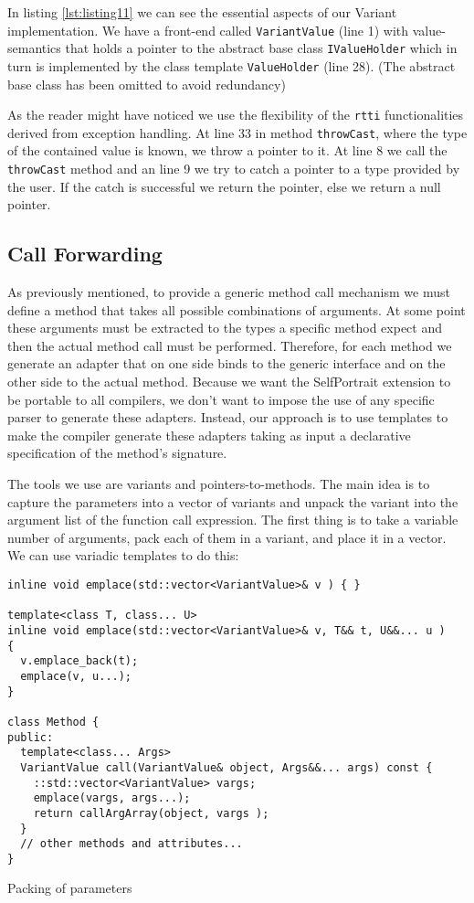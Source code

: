 In listing \ref{lst:listing11} we can see the essential aspects of our Variant implementation. We have a front-end called \texttt{VariantValue} (line 1)
with value-semantics that holds a pointer to the abstract base class \texttt{IValueHolder} which in turn is implemented by the class template
\texttt{ValueHolder} (line 28). (The abstract base class has been omitted to avoid redundancy)

As the reader might have noticed we use the flexibility of the \texttt{rtti} functionalities derived from exception handling.
At line 33 in method \texttt{throwCast}, where the type of the contained value is known, we throw a pointer to it. At line 8
we call the \texttt{throwCast} method and an line 9 we try to catch a pointer to a type provided by the user. If the catch is
successful we return the pointer, else we return a null pointer.

\subsection{Call Forwarding}

As previously mentioned, to provide a generic method call mechanism we must define a method that takes all possible combinations of arguments.
At some point these arguments must be extracted to the types a specific method expect and then the actual method call must be performed.
Therefore, for each method we generate an adapter that on one side binds to the generic interface and on the other side to the actual method.
Because we want the SelfPortrait extension to be portable to all compilers, we don't want to impose the use of any specific parser to generate
these adapters. Instead, our approach is to use templates to make the compiler generate these adapters taking as input a declarative specification
of the method's signature.

The tools we use are variants and pointers-to-methods. The main idea is to capture the parameters into a vector of variants and unpack the variant
into the argument list of the function call expression. The first thing is to take a variable number of arguments, pack each of them in a variant,
and place it in a vector. We can use variadic templates to do this:

\begin{listing}[H]
\begin{verbatim}
inline void emplace(std::vector<VariantValue>& v ) { }

template<class T, class... U>
inline void emplace(std::vector<VariantValue>& v, T&& t, U&&... u )
{
  v.emplace_back(t);
  emplace(v, u...);
}

class Method {
public:
  template<class... Args>
  VariantValue call(VariantValue& object, Args&&... args) const {
    ::std::vector<VariantValue> vargs;
    emplace(vargs, args...);
    return callArgArray(object, vargs );
  }
  // other methods and attributes...
}
\end{verbatim}
\caption{Packing of parameters}
\label{lst:listing6}
\end{listing}

